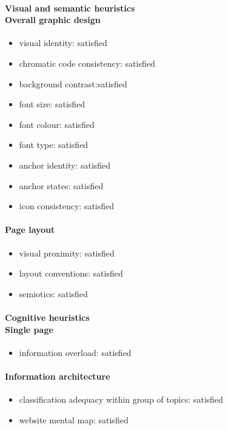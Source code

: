 \begin{enumerate}
	\paragraph*{Visual and semantic heuristics \\ Overall graphic design }
	\begin{itemize}
		\item visual identity: satisfied
		\item chromatic code consistency: satisfied
		\item background contrast:satisfied
		\item font size: satisfied
		\item font colour: satisfied
		\item font type: satisfied
		\item anchor identity: satisfied
		\item anchor states: satisfied
		\item icon consistency: satisfied
	\end{itemize}
	
	\paragraph*{Page layout}
	\begin{itemize}
		\item visual proximity: satisfied
		\item layout conventions: satisfied
		\item semiotics: satisfied
	\end{itemize}	
	
	\paragraph*{Cognitive heuristics \\ Single page}
	\begin{itemize}
		\item information overload: satisfied
	\end{itemize}	

	\paragraph*{Information architecture}
	\begin{itemize}
		\item classification adequacy within group of topics: satisfied
		\item website mental map: satisfied
	\end{itemize}


\end{enumerate}
